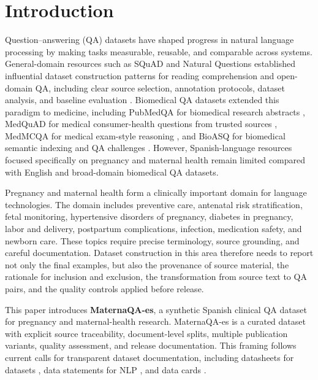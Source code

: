 \documentclass[conference]{IEEEtran}
\begin{document}
\section{Introduction}
Question--answering (QA) datasets have shaped progress in natural language processing by making tasks measurable, reusable, and comparable across systems. General-domain resources such as SQuAD and Natural Questions established influential dataset construction patterns for reading comprehension and open-domain QA, including clear source selection, annotation protocols, dataset analysis, and baseline evaluation \cite{Rajpurkar2016SQuAD,Kwiatkowski2019NaturalQuestions}. Biomedical QA datasets extended this paradigm to medicine, including PubMedQA for biomedical research abstracts \cite{Jin2019PubMedQA}, MedQuAD for medical consumer-health questions from trusted sources \cite{Abacha2019MedQuAD}, MedMCQA for medical exam-style reasoning \cite{Pal2022MedMCQA}, and BioASQ for biomedical semantic indexing and QA challenges \cite{Tsatsaronis2015BioASQ}. However, Spanish-language resources focused specifically on pregnancy and maternal health remain limited compared with English and broad-domain biomedical QA datasets.

Pregnancy and maternal health form a clinically important domain for language technologies. The domain includes preventive care, antenatal risk stratification, fetal monitoring, hypertensive disorders of pregnancy, diabetes in pregnancy, labor and delivery, postpartum complications, infection, medication safety, and newborn care. These topics require precise terminology, source grounding, and careful documentation. Dataset construction in this area therefore needs to report not only the final examples, but also the provenance of source material, the rationale for inclusion and exclusion, the transformation from source text to QA pairs, and the quality controls applied before release.

This paper introduces \textbf{MaternaQA-es}, a synthetic Spanish clinical QA dataset for pregnancy and maternal-health research. MaternaQA-es is a curated dataset with explicit source traceability, document-level splits, multiple publication variants, quality assessment, and release documentation. This framing follows current calls for transparent dataset documentation, including datasheets for datasets \cite{Gebru2021Datasheets}, data statements for NLP \cite{Bender2018DataStatements}, and data cards \cite{Pushkarna2022DataCards}.
\end{document}
